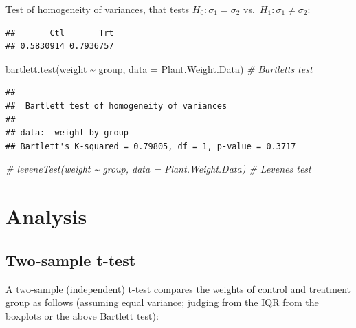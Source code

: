 \documentclass[
]{book}
\newenvironment{Shaded}{\begin{snugshade}}{\end{snugshade}}
\newcommand{\AttributeTok}[1]{\textcolor[rgb]{0.77,0.63,0.00}{#1}}
\newcommand{\CommentTok}[1]{\textcolor[rgb]{0.56,0.35,0.01}{\textit{#1}}}
\newcommand{\FunctionTok}[1]{\textcolor[rgb]{0.00,0.00,0.00}{#1}}
\newcommand{\NormalTok}[1]{#1}
\newcommand{\SpecialCharTok}[1]{\textcolor[rgb]{0.00,0.00,0.00}{#1}}
\begin{document}
Test of homogeneity of variances, that tests \(H_0 : \sigma_1 = \sigma_2\) vs.~\(H_1 : \sigma_1 \ne \sigma_2\):

\begin{Shaded}
\end{Shaded}

\begin{verbatim}
##       Ctl       Trt 
## 0.5830914 0.7936757
\end{verbatim}

\begin{Shaded}
\begin{Highlighting}[]
\FunctionTok{bartlett.test}\NormalTok{(weight }\SpecialCharTok{\textasciitilde{}}\NormalTok{ group, }\AttributeTok{data =}\NormalTok{ Plant.Weight.Data) }\CommentTok{\# Bartlett\textquotesingle{}s test}
\end{Highlighting}
\end{Shaded}

\begin{verbatim}
## 
##  Bartlett test of homogeneity of variances
## 
## data:  weight by group
## Bartlett's K-squared = 0.79805, df = 1, p-value = 0.3717
\end{verbatim}

\begin{Shaded}
\begin{Highlighting}[]
\CommentTok{\# leveneTest(weight \textasciitilde{} group, data = Plant.Weight.Data) \# Levene\textquotesingle{}s test}
\end{Highlighting}
\end{Shaded}

\hypertarget{analysis}{%
\section{Analysis}\label{analysis}}

\hypertarget{two-sample-t-test}{%
\subsection{Two-sample t-test}\label{two-sample-t-test}}

A two-sample (independent) t-test compares the weights of control and treatment group as follows (assuming equal variance; judging from the IQR from the boxplots or the above Bartlett test):
\end{document}
